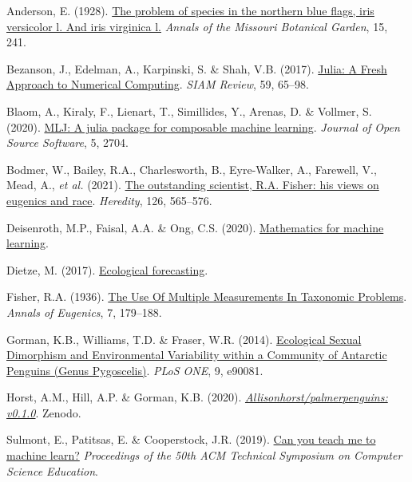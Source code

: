 \documentclass[
  letterpaper,
]{scrbook}
\newlength{\cslhangindent}
\newenvironment{CSLReferences}[2] %
 {\begin{list}{}{%
  \setlength{\itemindent}{0pt}
  \setlength{\leftmargin}{0pt}
  \setlength{\parsep}{0pt}
  \ifodd #1
   \setlength{\leftmargin}{\cslhangindent}
   \setlength{\itemindent}{-1\cslhangindent}
  \fi
  \setlength{\itemsep}{#2\baselineskip}}}
 {\end{list}}
\begin{document}
\label{refs-1}
\begin{CSLReferences}{1}{0}
Anderson, E. (1928). \href{https://doi.org/10.2307/2394087}{The problem
of species in the northern blue flags, iris versicolor l. And iris
virginica l.} \emph{Annals of the Missouri Botanical Garden}, 15, 241.

Bezanson, J., Edelman, A., Karpinski, S. \& Shah, V.B. (2017).
\href{https://doi.org/10.1137/141000671}{Julia: A Fresh Approach to
Numerical Computing}. \emph{SIAM Review}, 59, 65--98.

Blaom, A., Kiraly, F., Lienart, T., Simillides, Y., Arenas, D. \&
Vollmer, S. (2020). \href{https://doi.org/10.21105/joss.02704}{MLJ: A
julia package for composable machine learning}. \emph{Journal of Open
Source Software}, 5, 2704.

Bodmer, W., Bailey, R.A., Charlesworth, B., Eyre-Walker, A., Farewell,
V., Mead, A., \emph{et al.} (2021).
\href{https://doi.org/10.1038/s41437-020-00394-6}{The outstanding
scientist, R.A. Fisher: his views on eugenics and race}.
\emph{Heredity}, 126, 565--576.

Deisenroth, M.P., Faisal, A.A. \& Ong, C.S. (2020).
\href{https://doi.org/10.1017/9781108679930}{Mathematics for machine
learning}.

Dietze, M. (2017).
\href{https://doi.org/10.1515/9781400885459}{Ecological forecasting}.

Fisher, R.A. (1936).
\href{https://doi.org/10.1111/j.1469-1809.1936.tb02137.x}{The Use Of
Multiple Measurements In Taxonomic Problems}. \emph{Annals of Eugenics},
7, 179--188.

Gorman, K.B., Williams, T.D. \& Fraser, W.R. (2014).
\href{https://doi.org/10.1371/journal.pone.0090081}{Ecological Sexual
Dimorphism and Environmental Variability within a Community of Antarctic
Penguins (Genus Pygoscelis)}. \emph{PLoS ONE}, 9, e90081.

Horst, A.M., Hill, A.P. \& Gorman, K.B. (2020).
\emph{\href{https://doi.org/10.5281/ZENODO.3960218}{Allisonhorst/palmerpenguins:
v0.1.0}}. Zenodo.

Sulmont, E., Patitsas, E. \& Cooperstock, J.R. (2019).
\href{https://doi.org/10.1145/3287324.3287392}{Can you teach me to
machine learn?} \emph{Proceedings of the 50th ACM Technical Symposium on
Computer Science Education}.


\end{CSLReferences}
\end{document}
